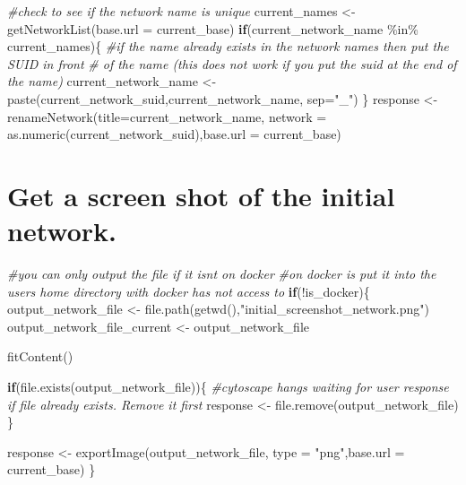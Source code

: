 \documentclass[
]{book}
\newenvironment{Shaded}{\begin{snugshade}}{\end{snugshade}}
\newcommand{\AttributeTok}[1]{\textcolor[rgb]{0.77,0.63,0.00}{#1}}
\newcommand{\CommentTok}[1]{\textcolor[rgb]{0.56,0.35,0.01}{\textit{#1}}}
\newcommand{\ControlFlowTok}[1]{\textcolor[rgb]{0.13,0.29,0.53}{\textbf{#1}}}
\newcommand{\FunctionTok}[1]{\textcolor[rgb]{0.00,0.00,0.00}{#1}}
\newcommand{\NormalTok}[1]{#1}
\newcommand{\OtherTok}[1]{\textcolor[rgb]{0.56,0.35,0.01}{#1}}
\newcommand{\SpecialCharTok}[1]{\textcolor[rgb]{0.00,0.00,0.00}{#1}}
\newcommand{\StringTok}[1]{\textcolor[rgb]{0.31,0.60,0.02}{#1}}
\begin{document}
\begin{Shaded}
\begin{Highlighting}[]
\CommentTok{\#check to see if the network name is unique}
\NormalTok{current\_names }\OtherTok{\textless{}{-}} \FunctionTok{getNetworkList}\NormalTok{(}\AttributeTok{base.url =}\NormalTok{ current\_base)}
\ControlFlowTok{if}\NormalTok{(current\_network\_name }\SpecialCharTok{\%in\%}\NormalTok{ current\_names)\{}
  \CommentTok{\#if the name already exists in the network names then put the SUID in front}
  \CommentTok{\# of the name (this does not work if you put the suid at the end of the name)}
\NormalTok{  current\_network\_name }\OtherTok{\textless{}{-}} \FunctionTok{paste}\NormalTok{(current\_network\_suid,current\_network\_name,  }\AttributeTok{sep=}\StringTok{"\_"}\NormalTok{)}
\NormalTok{\}}
\NormalTok{response }\OtherTok{\textless{}{-}} \FunctionTok{renameNetwork}\NormalTok{(}\AttributeTok{title=}\NormalTok{current\_network\_name, }
                       \AttributeTok{network =} \FunctionTok{as.numeric}\NormalTok{(current\_network\_suid),}\AttributeTok{base.url =}\NormalTok{ current\_base)}
\end{Highlighting}
\end{Shaded}

\hypertarget{get-a-screen-shot-of-the-initial-network.-1}{%
\section{Get a screen shot of the initial network.}\label{get-a-screen-shot-of-the-initial-network.-1}}

\begin{Shaded}
\begin{Highlighting}[]
\CommentTok{\#you can only output the file if it isn\textquotesingle{}t on docker}
\CommentTok{\#on docker is put it into the user\textquotesingle{}s home directory with docker has not access to}
\ControlFlowTok{if}\NormalTok{(}\SpecialCharTok{!}\NormalTok{is\_docker)\{}
\NormalTok{  output\_network\_file }\OtherTok{\textless{}{-}} \FunctionTok{file.path}\NormalTok{(}\FunctionTok{getwd}\NormalTok{(),}\StringTok{"initial\_screenshot\_network.png"}\NormalTok{)}
\NormalTok{  output\_network\_file\_current }\OtherTok{\textless{}{-}}\NormalTok{ output\_network\_file}

  \FunctionTok{fitContent}\NormalTok{()}

  \ControlFlowTok{if}\NormalTok{(}\FunctionTok{file.exists}\NormalTok{(output\_network\_file))\{}
    \CommentTok{\#cytoscape hangs waiting for user response if file already exists.  Remove it first}
\NormalTok{    response }\OtherTok{\textless{}{-}} \FunctionTok{file.remove}\NormalTok{(output\_network\_file)}
\NormalTok{  \} }

\NormalTok{  response }\OtherTok{\textless{}{-}} \FunctionTok{exportImage}\NormalTok{(output\_network\_file, }\AttributeTok{type =} \StringTok{"png"}\NormalTok{,}\AttributeTok{base.url =}\NormalTok{ current\_base)}
\NormalTok{\}}
\end{Highlighting}
\end{Shaded}
\end{document}
